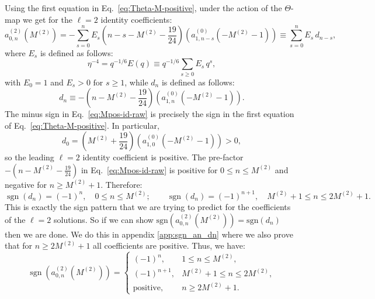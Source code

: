 \documentclass[11pt]{article}
\newcommand\be{\begin{equation}}
\newcommand\ee{\end{equation}}
\begin{document}
Using the first equation in Eq.~\eqref{eq:Theta-M-positive}, under the action of the $\Theta$-map we get for the $\ell=2$ identity coefficients:
\begin{equation}
        a^{(2)}_{0,n}(M^{(2)})
        =
        -\sum_{s=0}^{n}E_s\left(
        n-s-M^{(2)}-\frac{19}{24}
        \right)
        \left(a^{(0)}_{1,n-s}(-M^{(2)}-1)\right)\equiv \sum_{s=0}^{n}E_s\,d_{n-s},
\label{eq:Mpos-id-conv}
\end{equation}
where $E_s$ is defined as follows:
\begin{equation}
        \eta^{-4}
        =
        q^{-1/6}E(q)
        \equiv q^{-1/6}
        \sum_{s\ge0}E_s\,q^s,
\label{eq:E-kernel-def}
\end{equation}
with $E_0=1$ and $E_s>0\,\,\text{for }s\ge1$, while $d_n$ is defined as follows:
\begin{equation}
        d_n
        \equiv
        -
        \left(
        n-M^{(2)}-\frac{19}{24}
        \right)
        \left(a^{(0)}_{1,n}(-M^{(2)}-1)\right).
\label{eq:Mpos-id-raw}
\end{equation}
The minus sign in Eq.~\eqref{eq:Mpos-id-raw} is precisely the sign in the first equation of Eq.~\eqref{eq:Theta-M-positive}. In particular,
\be
        d_0
        =
        \left(M^{(2)}+\frac{19}{24}\right)\left(a^{(0)}_{1,0}(-M^{(2)}-1)\right)>0,
\ee
so the leading $\ell=2$ identity coefficient is positive. The pre-factor $-\left(n-M^{(2)}-\frac{19}{24}\right)$ in Eq.~\eqref{eq:Mpos-id-raw} is positive for \(0\le n\le M^{(2)}\) and negative for \(n\ge M^{(2)}+1\). Therefore:
\be
        \operatorname{sgn}(d_n)=(-1)^n,\quad 0\le n\le M^{(2)}; \qquad
        \operatorname{sgn}(d_n)=(-1)^{n+1},
        \quad M^{(2)}+1\le n\le2M^{(2)}+1.
\ee
This is exactly the sign pattern that we are trying to predict for the coefficients of the $\ell=2$ solutions. 
So if we can show $\text{sgn}(a_{0,n}^{(2)}(M^{(2)}))=\text{sgn}(d_n)$ then we are done. We do this in appendix \ref{app:sgn_an_dn} where we also prove that for $n\geq 2M^{(2)}+1$ all coefficients are positive. Thus, we have:
\begin{equation}
\operatorname{sgn}\left(a^{(2)}_{0,n}(M^{(2)})\right)
=
\begin{cases}
(-1)^n, & 1\le n\le M^{(2)},\\
(-1)^{n+1}, & M^{(2)}+1\le n\le2M^{(2)},\\
\text{positive}, & n\ge2M^{(2)}+1.
\end{cases}
\label{eq:Mpos-id-sign-final}
\end{equation}
\end{document}
